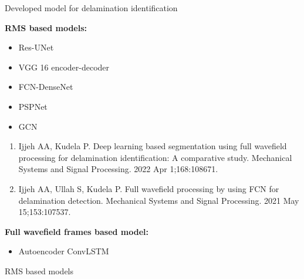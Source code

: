 \documentclass[10pt,aspectratio=169]{beamer} %
\begin{document}
\begin{frame}{Developed model for delamination identification}
	\begin{minipage}[c]{0.45\textwidth}
		\textbf{RMS based models: \\}
			\begin{itemize}
				\item Res-UNet
				\item VGG 16 encoder-decoder
				\item FCN-DenseNet
				\item PSPNet
				\item GCN
			\end{itemize}
		{\tiny  
			\begin{enumerate}
				\item Ijjeh AA, Kudela P. Deep learning based segmentation using full wavefield processing for delamination identification: A comparative study. Mechanical Systems and Signal Processing. 2022 Apr 1;168:108671.
				\item Ijjeh AA, Ullah S, Kudela P. Full wavefield processing by using FCN for delamination detection. Mechanical Systems and Signal Processing. 2021 May 15;153:107537.
				
			\end{enumerate}}	
	\end{minipage}
	\hfill
	\begin{minipage}[c]{.45\textwidth}
	\textbf{Full wavefield frames based model:}
		\begin{itemize}
			\item Autoencoder ConvLSTM
		\end{itemize}
	\end{minipage}
\end{frame}
\setcounter{subfigure}{0}
\begin{frame}{RMS based models}
	\begin{minipage}[c]{0.55\textwidth}
		\begin{figure}
		\end{figure}
	\end{minipage}
	\begin{minipage}[c]{0.35\textwidth}
		\begin{figure}
\end{figure}
	\end{minipage}

\end{frame}
\end{document}
